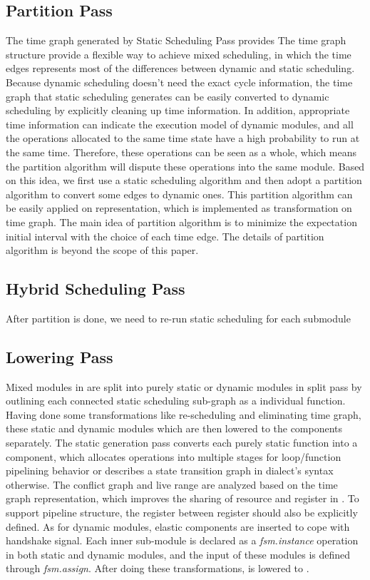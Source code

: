 \subsection{Partition Pass}
The time graph generated by Static Scheduling Pass provides 
The time graph structure provide a flexible way to achieve mixed scheduling, in which the time edges represents most of the differences between dynamic and static scheduling. Because dynamic scheduling doesn't need the exact cycle information, the time graph that static scheduling generates can be easily converted to dynamic scheduling by explicitly cleaning up time information. In addition, appropriate time information can indicate the execution model of dynamic modules, and all the operations allocated to the same time state have a high probability to run at the same time. Therefore, these operations can be seen as a whole, which means the partition algorithm will dispute these operations into the same module. Based on this idea, we first use a static scheduling algorithm and then adopt a partition algorithm to convert some edges to dynamic ones. This partition algorithm can be easily applied on \dsir{} representation, which is implemented as transformation on time graph. The main idea of partition algorithm is to minimize the expectation initial interval with the choice of each time edge. The details of partition algorithm is beyond the scope of this paper.

\subsection{Hybrid Scheduling Pass}
After partition is done, we need to re-run static scheduling for each submodule
\subsection{\dsir{} Lowering Pass}
Mixed modules in \dsir{} are split into purely static or dynamic \dsir{} modules in split pass by outlining each connected static scheduling sub-graph as a individual function. Having done some transformations like re-scheduling and eliminating time graph, these static and dynamic modules which are then lowered to the \fsm{} components separately. The static \fsm{} generation pass converts each purely static \dsir{} function into a \fsm{} component, which allocates operations into multiple stages for loop/function pipelining behavior or describes a state transition graph in \fsm{} dialect's syntax otherwise. The conflict graph and live range are analyzed based on the time graph representation, which improves the sharing of resource and register in \fsm{}. To support pipeline structure, the register between register should also be explicitly defined. As for dynamic modules, elastic components are inserted to cope with handshake signal. Each inner sub-module is declared as a \emph{fsm.instance} operation in both static and dynamic modules, and the input of these modules is defined through \emph{fsm.assign}. After doing these transformations, \dsir{} is lowered to \fsm{}.

